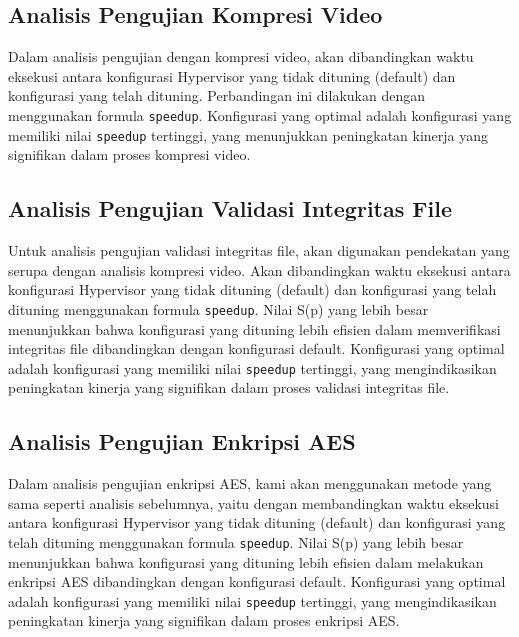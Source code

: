 \subsection{Analisis Pengujian Kompresi Video}
Dalam analisis pengujian dengan kompresi video, akan dibandingkan waktu eksekusi antara konfigurasi Hypervisor yang tidak dituning (default) dan konfigurasi yang telah dituning. Perbandingan ini dilakukan dengan menggunakan formula \texttt{speedup}. Konfigurasi yang optimal adalah konfigurasi yang memiliki nilai \texttt{speedup} tertinggi, yang menunjukkan peningkatan kinerja yang signifikan dalam proses kompresi video.

\subsection{Analisis Pengujian Validasi Integritas File}
Untuk analisis pengujian validasi integritas file, akan digunakan pendekatan yang serupa dengan analisis kompresi video. Akan dibandingkan waktu eksekusi antara konfigurasi Hypervisor yang tidak dituning (default) dan konfigurasi yang telah dituning menggunakan formula \texttt{speedup}. Nilai S(p) yang lebih besar menunjukkan bahwa konfigurasi yang dituning lebih efisien dalam memverifikasi integritas file dibandingkan dengan konfigurasi default. Konfigurasi yang optimal adalah konfigurasi yang memiliki nilai \texttt{speedup} tertinggi, yang mengindikasikan peningkatan kinerja yang signifikan dalam proses validasi integritas file.

\subsection{Analisis Pengujian Enkripsi AES}
Dalam analisis pengujian enkripsi AES, kami akan menggunakan metode yang sama seperti analisis sebelumnya, yaitu dengan membandingkan waktu eksekusi antara konfigurasi Hypervisor yang tidak dituning (default) dan konfigurasi yang telah dituning menggunakan formula \texttt{speedup}. Nilai S(p) yang lebih besar menunjukkan bahwa konfigurasi yang dituning lebih efisien dalam melakukan enkripsi AES dibandingkan dengan konfigurasi default. Konfigurasi yang optimal adalah konfigurasi yang memiliki nilai \texttt{speedup} tertinggi, yang mengindikasikan peningkatan kinerja yang signifikan dalam proses enkripsi AES.

